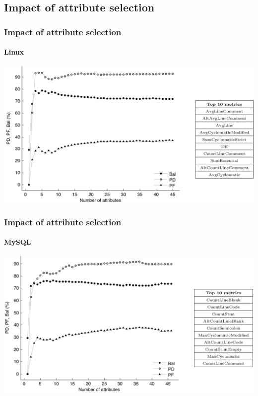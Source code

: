 \documentclass{beamer}
\begin{document}
\subsection{Impact of attribute selection}
\begin{frame}
 \frametitle{Impact of attribute selection}
 \framesubtitle{Linux}
 \begin{center}
  \includegraphics[width=\textwidth]{figures/attributesLinux.png}
 \end{center}
\end{frame}

\begin{frame}
 \frametitle{Impact of attribute selection}
 \framesubtitle{MySQL}
 \begin{center}
  \includegraphics[width=\textwidth]{figures/attributesMysql.png}
 \end{center}
\end{frame}
\end{document}
